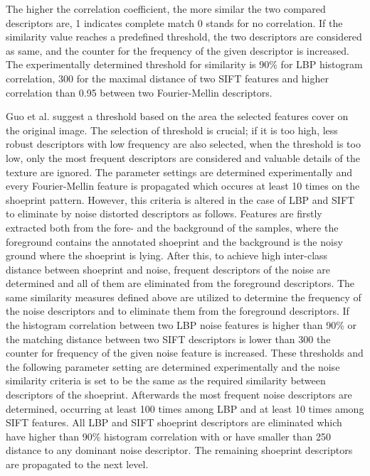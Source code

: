 \documentclass[draft,final]{vutinfth} %
\begin{document}
The higher the correlation coefficient, the more similar the two compared descriptors are, 1 indicates complete match 0 stands for no correlation.
If the similarity value reaches a predefined threshold, the two descriptors are considered as same, and the counter for the frequency of the given descriptor is increased.
The experimentally determined threshold for similarity is  90\% for LBP histogram correlation, 300 for the maximal distance of two SIFT features and higher correlation than 0.95 between two Fourier-Mellin descriptors.
\par
Guo et al. \cite{guo2012discriminative} suggest a threshold based on the area the selected features cover on the original image.
The selection of threshold is crucial; if it is too high, less robust descriptors with low frequency are also selected, when the threshold is too low, only the most frequent descriptors are considered and valuable details of the texture are ignored.
The parameter settings are determined experimentally and every Fourier-Mellin feature is propagated which occures at least 10 times on the shoeprint pattern.
However, this criteria is altered in the case of LBP and SIFT to eliminate by noise distorted descriptors as follows.
Features are firstly extracted both from the fore- and the background of the samples, where the foreground contains the annotated shoeprint and the background is the noisy ground where the shoeprint is lying. 
After this, to achieve high inter-class distance between shoeprint and noise, frequent descriptors of the noise are determined and all of them are eliminated from the foreground descriptors.
The same similarity measures defined above are utilized to determine the frequency of the noise descriptors and to eliminate them from the foreground descriptors.
If the histogram correlation between two LBP noise features is higher than 90\% or the matching distance between two SIFT descriptors is lower than 300 the counter for frequency of the given noise feature is increased.
These thresholds and the following parameter setting are determined experimentally and the noise similarity criteria is set to be the same as the required similarity between descriptors of the shoeprint.
Afterwards the most frequent noise descriptors are determined, occurring at least 100 times among LBP and at least 10 times among SIFT features.
All LBP and SIFT shoeprint descriptors are eliminated which have higher than 90\% histogram correlation with or have smaller than 250 distance to any dominant noise descriptor.
The remaining shoeprint descriptors are propagated to the next level. 
\end{document}
